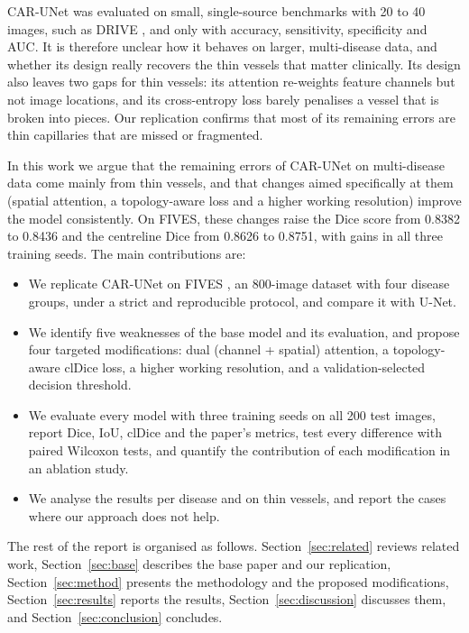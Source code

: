 \documentclass[a4paper,fleqn]{cas-sc}
\begin{document}
CAR-UNet was evaluated on small, single-source benchmarks with 20 to 40 images, such as DRIVE \citep{staal2004drive}, and only with accuracy, sensitivity, specificity and AUC. It is therefore unclear how it behaves on larger, multi-disease data, and whether its design really recovers the thin vessels that matter clinically. Its design also leaves two gaps for thin vessels: its attention re-weights feature channels but not image locations, and its cross-entropy loss barely penalises a vessel that is broken into pieces. Our replication confirms that most of its remaining errors are thin capillaries that are missed or fragmented.

In this work we argue that the remaining errors of CAR-UNet on multi-disease data come mainly from thin vessels, and that changes aimed specifically at them (spatial attention, a topology-aware loss and a higher working resolution) improve the model consistently. On FIVES, these changes raise the Dice score from 0.8382 to 0.8436 and the centreline Dice from 0.8626 to 0.8751, with gains in all three training seeds. The main contributions are:
\begin{itemize}
\item We replicate CAR-UNet on FIVES \citep{jin2022fives}, an 800-image dataset with four disease groups, under a strict and reproducible protocol, and compare it with U-Net.
\item We identify five weaknesses of the base model and its evaluation, and propose four targeted modifications: dual (channel + spatial) attention, a topology-aware clDice loss, a higher working resolution, and a validation-selected decision threshold.
\item We evaluate every model with three training seeds on all 200 test images, report Dice, IoU, clDice and the paper's metrics, test every difference with paired Wilcoxon tests, and quantify the contribution of each modification in an ablation study.
\item We analyse the results per disease and on thin vessels, and report the cases where our approach does not help.
\end{itemize}

The rest of the report is organised as follows. Section~\ref{sec:related} reviews related work, Section~\ref{sec:base} describes the base paper and our replication, Section~\ref{sec:method} presents the methodology and the proposed modifications, Section~\ref{sec:results} reports the results, Section~\ref{sec:discussion} discusses them, and Section~\ref{sec:conclusion} concludes.
\end{document}
